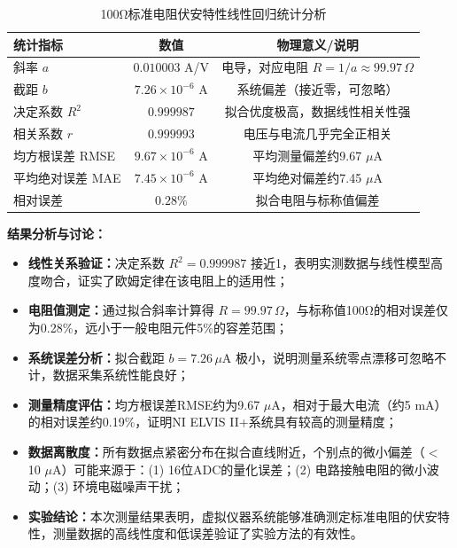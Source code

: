 \documentclass[11pt]{article}
\begin{document}
\begin{table}[H]
  \centering
  \small
  \begin{tabular}{lcc}
    \toprule
    \textbf{统计指标} & \textbf{数值} & \textbf{物理意义/说明} \\
    \midrule
    斜率 $a$ & $0.010003$ A/V & 电导，对应电阻 $R = 1/a \approx 99.97\,\Omega$ \\
    截距 $b$ & $7.26 \times 10^{-6}$ A & 系统偏差（接近零，可忽略） \\
    决定系数 $R^2$ & $0.999987$ & 拟合优度极高，数据线性相关性强 \\
    相关系数 $r$ & $0.999993$ & 电压与电流几乎完全正相关 \\
    均方根误差 RMSE & $9.67 \times 10^{-6}$ A & 平均测量偏差约9.67 $\mu$A \\
    平均绝对误差 MAE & $7.45 \times 10^{-6}$ A & 平均绝对偏差约7.45 $\mu$A \\
    相对误差 & $0.28\%$ & 拟合电阻与标称值偏差 \\
    \bottomrule
  \end{tabular}
  \caption{100Ω标准电阻伏安特性线性回归统计分析}
  \label{tab:linear_regression_stats}
\end{table}

\noindent\textbf{结果分析与讨论：}
\begin{itemize}[leftmargin=2em,itemsep=2pt,parsep=0.5ex]
    \item \textbf{线性关系验证：}决定系数 $R^2 = 0.999987$ 接近1，表明实测数据与线性模型高度吻合，证实了欧姆定律在该电阻上的适用性；
    
    \item \textbf{电阻值测定：}通过拟合斜率计算得 $R = 99.97\,\Omega$，与标称值100Ω的相对误差仅为0.28\%，远小于一般电阻元件5\%的容差范围；
    
    \item \textbf{系统误差分析：}拟合截距 $b = 7.26\,\mu\text{A}$ 极小，说明测量系统零点漂移可忽略不计，数据采集系统性能良好；
    
    \item \textbf{测量精度评估：}均方根误差RMSE约为9.67 $\mu$A，相对于最大电流（约5 mA）的相对误差约0.19\%，证明NI ELVIS II+系统具有较高的测量精度；
    
    \item \textbf{数据离散度：}所有数据点紧密分布在拟合直线附近，个别点的微小偏差（$<$10 $\mu$A）可能来源于：(1) 16位ADC的量化误差；(2) 电路接触电阻的微小波动；(3) 环境电磁噪声干扰；
    
    \item \textbf{实验结论：}本次测量结果表明，虚拟仪器系统能够准确测定标准电阻的伏安特性，测量数据的高线性度和低误差验证了实验方法的有效性。
\end{itemize}
\end{document}
